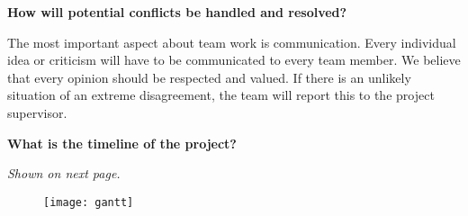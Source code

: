 \vspace{1em}
\noindent \textbf{How will potential conflicts be handled and resolved?}

\vspace{1em}
\noindent The most important aspect about team work is communication. Every individual idea or criticism will have to be communicated to every team member. We believe that every opinion should be respected and valued. If there is an unlikely situation of an extreme disagreement, the team will report this to the project supervisor.  

\vspace{1em}
\noindent \textbf{What is the timeline of the project?}

\vspace{1em}
\noindent \textit{Shown on next page.}
\newpage
\begin{figure}[t]
\texttt{[image: gantt]}
\centering
\end{figure}